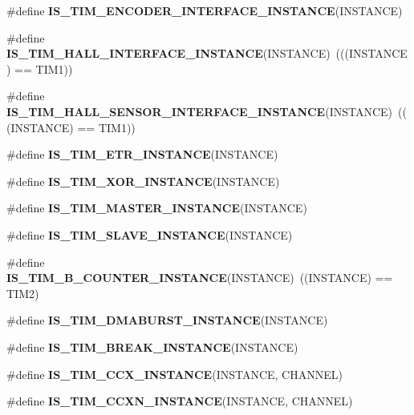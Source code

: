 \begin{DoxyCompactItemize}
\item 
\#define {\bfseries I\+S\+\_\+\+T\+I\+M\+\_\+\+E\+N\+C\+O\+D\+E\+R\+\_\+\+I\+N\+T\+E\+R\+F\+A\+C\+E\+\_\+\+I\+N\+S\+T\+A\+N\+CE}(I\+N\+S\+T\+A\+N\+CE)
\item 
\mbox{\label{group___exported__macro_gacdcc047699e2d83c9d2b3a3f8375dff4}} 
\#define {\bfseries I\+S\+\_\+\+T\+I\+M\+\_\+\+H\+A\+L\+L\+\_\+\+I\+N\+T\+E\+R\+F\+A\+C\+E\+\_\+\+I\+N\+S\+T\+A\+N\+CE}(I\+N\+S\+T\+A\+N\+CE)~(((I\+N\+S\+T\+A\+N\+CE) == T\+I\+M1))
\item 
\mbox{\label{group___exported__macro_ga979ea18ba0931f5ed15cc2f3ac84794b}} 
\#define {\bfseries I\+S\+\_\+\+T\+I\+M\+\_\+\+H\+A\+L\+L\+\_\+\+S\+E\+N\+S\+O\+R\+\_\+\+I\+N\+T\+E\+R\+F\+A\+C\+E\+\_\+\+I\+N\+S\+T\+A\+N\+CE}(I\+N\+S\+T\+A\+N\+CE)~(((I\+N\+S\+T\+A\+N\+CE) == T\+I\+M1))
\item 
\#define {\bfseries I\+S\+\_\+\+T\+I\+M\+\_\+\+E\+T\+R\+\_\+\+I\+N\+S\+T\+A\+N\+CE}(I\+N\+S\+T\+A\+N\+CE)
\item 
\#define {\bfseries I\+S\+\_\+\+T\+I\+M\+\_\+\+X\+O\+R\+\_\+\+I\+N\+S\+T\+A\+N\+CE}(I\+N\+S\+T\+A\+N\+CE)
\item 
\#define {\bfseries I\+S\+\_\+\+T\+I\+M\+\_\+\+M\+A\+S\+T\+E\+R\+\_\+\+I\+N\+S\+T\+A\+N\+CE}(I\+N\+S\+T\+A\+N\+CE)
\item 
\#define {\bfseries I\+S\+\_\+\+T\+I\+M\+\_\+\+S\+L\+A\+V\+E\+\_\+\+I\+N\+S\+T\+A\+N\+CE}(I\+N\+S\+T\+A\+N\+CE)
\item 
\mbox{\label{group___exported__macro_gac41867bf288927ff8ff10a85e67a591b}} 
\#define {\bfseries I\+S\+\_\+\+T\+I\+M\+\_\+B\+\_\+\+C\+O\+U\+N\+T\+E\+R\+\_\+\+I\+N\+S\+T\+A\+N\+CE}(I\+N\+S\+T\+A\+N\+CE)~((I\+N\+S\+T\+A\+N\+CE) == T\+I\+M2)
\item 
\#define {\bfseries I\+S\+\_\+\+T\+I\+M\+\_\+\+D\+M\+A\+B\+U\+R\+S\+T\+\_\+\+I\+N\+S\+T\+A\+N\+CE}(I\+N\+S\+T\+A\+N\+CE)
\item 
\#define {\bfseries I\+S\+\_\+\+T\+I\+M\+\_\+\+B\+R\+E\+A\+K\+\_\+\+I\+N\+S\+T\+A\+N\+CE}(I\+N\+S\+T\+A\+N\+CE)
\item 
\#define {\bfseries I\+S\+\_\+\+T\+I\+M\+\_\+\+C\+C\+X\+\_\+\+I\+N\+S\+T\+A\+N\+CE}(I\+N\+S\+T\+A\+N\+CE,  C\+H\+A\+N\+N\+EL)
\item 
\#define {\bfseries I\+S\+\_\+\+T\+I\+M\+\_\+\+C\+C\+X\+N\+\_\+\+I\+N\+S\+T\+A\+N\+CE}(I\+N\+S\+T\+A\+N\+CE,  C\+H\+A\+N\+N\+EL)

\end{DoxyCompactItemize}
